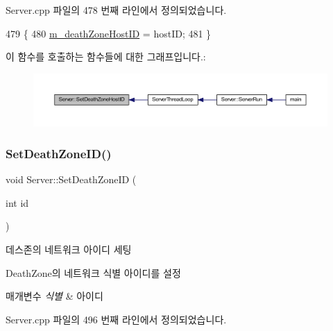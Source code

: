 Server.\+cpp 파일의 478 번째 라인에서 정의되었습니다.


\begin{DoxyCode}
479 \{
480     \hyperlink{class_server_af34b71075ab32b4b7a4da757c87ded13}{m\_deathZoneHostID} = hostID;
481 \}
\end{DoxyCode}
이 함수를 호출하는 함수들에 대한 그래프입니다.\+:\nopagebreak
\begin{figure}[H]
\begin{center}
\leavevmode
\includegraphics[width=350pt]{class_server_a78cb51003b1a243780c2845263e75b29_icgraph}
\end{center}
\end{figure}
\mbox{\label{class_server_a97583a37e049f390e255a61afbac02a2}} 
\subsubsection{\texorpdfstring{Set\+Death\+Zone\+I\+D()}{SetDeathZoneID()}}
{\footnotesize\ttfamily void Server\+::\+Set\+Death\+Zone\+ID (\begin{DoxyParamCaption}\item[{int}]{id }\end{DoxyParamCaption})}



데스존의 네트워크 아이디 세팅 

Death\+Zone의 네트워크 식별 아이디를 설정


\begin{DoxyParams}{매개변수}
{\em 식별} & 아이디 \\
\hline
\end{DoxyParams}


Server.\+cpp 파일의 496 번째 라인에서 정의되었습니다.



